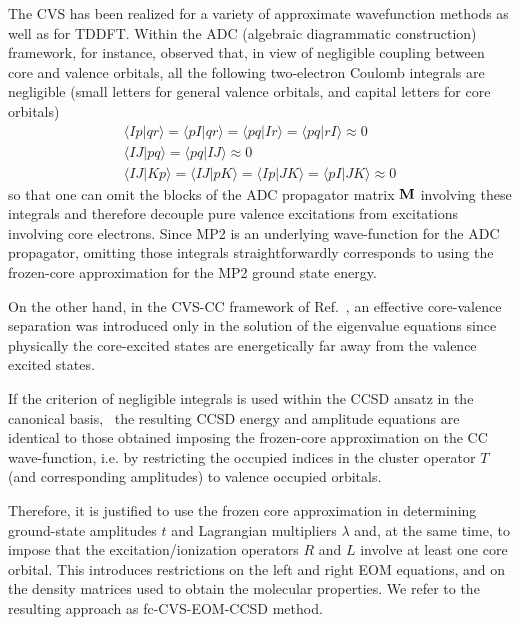 \documentclass[journal=jctcce,manuscript=article]{achemso}
\begin{document}
The CVS has been realized for a variety of approximate 
wavefunction methods as well as for TDDFT.
Within the ADC (algebraic diagrammatic construction)
framework\cite{Dreuw:ADCrev:2014}, for instance, \citeauthor{wenzel2014}\cite{wenzel2014} observed that, in view of negligible coupling between core and valence orbitals, all the following two-electron Coulomb integrals are negligible
(small letters for general valence orbitals, and capital letters for core orbitals)
\begin{align}
\langle Ip|qr \rangle = \langle pI|qr \rangle = \langle pq|Ir \rangle =
\langle pq|rI \rangle \approx 0 \\\nonumber 
\langle IJ | pq \rangle = \langle pq |IJ \rangle \approx 0 \\\nonumber
\langle IJ | Kp \rangle = \langle IJ | pK \rangle = 
\langle Ip | JK \rangle = \langle pI | JK \rangle \approx 0
\end{align}
so that one can omit the blocks of the ADC propagator matrix ${\bf M}$ involving these integrals and therefore decouple pure valence excitations from excitations involving core electrons.
Since MP2 is an underlying wave-function for the ADC propagator\cite{Dreuw:ADCrev:2014}, omitting those integrals straightforwardly corresponds to using the frozen-core approximation for the MP2 ground state energy.

On the other hand, in the CVS-CC framework of Ref.~, an effective core-valence separation was introduced only in the solution of the eigenvalue equations since physically the core-excited states are energetically far away from the valence excited states.

If the criterion of negligible integrals is used within the CCSD ansatz in the canonical basis,~\cite{Purvis_and_Bartlett} the resulting CCSD energy and amplitude equations are identical to those obtained imposing the frozen-core approximation on the CC wave-function, i.e. by restricting the occupied indices in the cluster operator $T$ (and corresponding amplitudes) to valence occupied orbitals.

Therefore, it is justified to use the frozen core approximation in determining ground-state amplitudes $t$ and Lagrangian multipliers ${\lambda}$ and, at the same time, to impose that the excitation/ionization operators $R$ and $L$ involve at least one core orbital. 
This introduces restrictions on the left and right EOM equations, and on the density matrices used to obtain the molecular properties.   
We refer to the resulting approach as fc-CVS-EOM-CCSD method.
\end{document}

